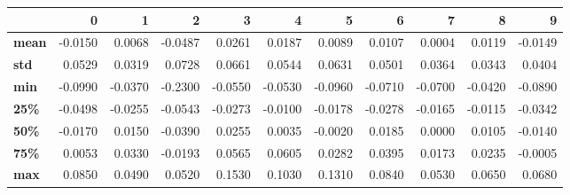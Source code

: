 \begin{tabular}{lrrrrrrrrrr}
\toprule
{} &       0 &       1 &       2 &       3 &       4 &       5 &       6 &       7 &       8 &       9 \\
\midrule
\textbf{mean} & -0.0150 &  0.0068 & -0.0487 &  0.0261 &  0.0187 &  0.0089 &  0.0107 &  0.0004 &  0.0119 & -0.0149 \\
\textbf{std } &  0.0529 &  0.0319 &  0.0728 &  0.0661 &  0.0544 &  0.0631 &  0.0501 &  0.0364 &  0.0343 &  0.0404 \\
\textbf{min } & -0.0990 & -0.0370 & -0.2300 & -0.0550 & -0.0530 & -0.0960 & -0.0710 & -0.0700 & -0.0420 & -0.0890 \\
\textbf{25\% } & -0.0498 & -0.0255 & -0.0543 & -0.0273 & -0.0100 & -0.0178 & -0.0278 & -0.0165 & -0.0115 & -0.0342 \\
\textbf{50\% } & -0.0170 &  0.0150 & -0.0390 &  0.0255 &  0.0035 & -0.0020 &  0.0185 &  0.0000 &  0.0105 & -0.0140 \\
\textbf{75\% } &  0.0053 &  0.0330 & -0.0193 &  0.0565 &  0.0605 &  0.0282 &  0.0395 &  0.0173 &  0.0235 & -0.0005 \\
\textbf{max } &  0.0850 &  0.0490 &  0.0520 &  0.1530 &  0.1030 &  0.1310 &  0.0840 &  0.0530 &  0.0650 &  0.0680 \\
\bottomrule
\end{tabular}
